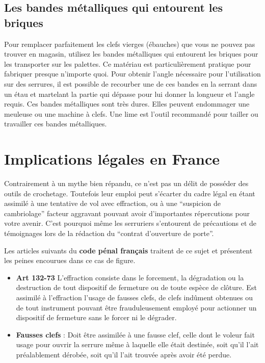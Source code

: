 \documentclass[a4paper,french,11pt,twoside]{report}
\begin{document}
\subsection{Les bandes métalliques qui entourent les briques}

Pour remplacer parfaitement les clefs vierges (ébauches) que vous ne pouvez pas trouver en magasin, utilisez les bandes métalliques qui entourent les briques pour les transporter sur les palettes. Ce matériau est particulièrement pratique pour fabriquer presque n'importe quoi. Pour obtenir l'angle nécessaire pour l'utilisation sur des serrures, il est possible de recourber une de ces bandes en la serrant dans un étau et martelant la partie qui dépasse pour lui donner la longueur et l'angle requis. Ces bandes métalliques sont très dures. Elles peuvent endommager une meuleuse ou une machine à clefs. Une lime est l'outil recommandé pour tailler ou travailler ces bandes métalliques.

\section{Implications légales en France}

Contrairement à un mythe bien répandu, ce n'est pas un délit de posséder des outils de crochetage. Toutefois leur emploi peut s'écarter du cadre légal en étant assimilé à une tentative de vol avec effraction, ou à une \enquote{suspicion de cambriolage} facteur aggravant pouvant avoir d'importantes répercutions pour votre avenir. C'est pourquoi même les serruriers s'entourent de précautions et de témoignages lors de la rédaction du \enquote{contrat d'ouverture de porte}.

Les articles suivants du \textbf{code pénal français} traitent de ce sujet et présentent les peines encourues dans ce cas de figure.

\begin{itemize}
\item{\textbf{Art 132-73} L'effraction consiste dans le forcement, la dégradation ou la destruction de tout dispositif de fermeture ou de toute espèce de clôture. Est assimilé à l'effraction l'usage de fausses clefs, de clefs indûment obtenues ou de tout instrument pouvant être frauduleusement employé pour actionner un dispositif de fermeture sans le forcer ni le dégrader.}
\item{\textbf{Fausses clefs} : Doit être assimilée à une fausse clef, celle dont le voleur fait usage pour ouvrir la serrure même à laquelle elle était destinée, soit qu'il l'ait préalablement dérobée, soit qu'il l'ait trouvée après avoir été perdue.}
\end{itemize}
\end{document}
